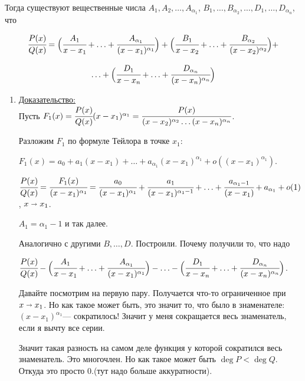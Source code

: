 \documentclass{article}
\newcommand{\prooff}[1]{{\underline{Доказательство:}} \\ }
\begin{document}
Тогда существуют вещественные числа $A_1, A_2,\ldots, A_{\alpha_1}$, $B_1,\ldots, B_{\alpha_2},\ldots, D_{1},\ldots, D_{\alpha_n}$, что

\[\cfrac{P(x)}{Q(x)}=\Big(\cfrac{A_1}{x-x_1}+ \ldots + \cfrac{A_{\alpha_1}}{(x-x_1)^{\alpha_1}}\Big) +\Big(\cfrac{B_1}{x-x_2}+ \ldots + \cfrac{B_{\alpha_2}}{(x-x_2)^{\alpha_2}}\Big) +\]

\[ \ldots + \Big(\cfrac{D_1}{x-x_n}+ \ldots + \cfrac{D_{\alpha_n}}{(x-x_n)^{\alpha_n}}\Big)\]

\begin{enumerate}
    \item[] \prooff{}
    Пусть $F_1(x) = \cfrac{P(x)}{Q(x)}(x-x_1)^{\alpha_1} = \cfrac{P(x)}{(x-x_2)^{\alpha_2}\ldots(x-x_n)^{\alpha_n}}$.

    Разложим $F_1$ по формуле Тейлора в точке $x_1$:

    $F_1(x) = a_0 + a_1(x-x_1) + \ldots + a_{\alpha_1}(x-x_1)^{\alpha_1}+o((x-x_1)^{\alpha_1})$.

    $\cfrac{P(x)}{Q(x)} = \cfrac{F_1(x)}{(x-x_1)^{\alpha_1}} = \cfrac{a_0}{(x-x_1)^{\alpha_1}} + \cfrac{a_1}{(x-x_1)^{\alpha_1-1}}+\ldots + \cfrac{a_{\alpha_1-1}}{(x-x_1)} + a_{\alpha_1}+o(1)$, $x\shortrightarrow x_1$.

    $A_1 = \alpha_1-1$  и так далее.

    Аналогично с другими $B,\ldots, D$. Построили. Почему получили то, что надо

    $\cfrac{P(x)}{Q(x)}-\Big(\cfrac{A_1}{x-x_1}+\ldots + \cfrac{A_{\alpha_1}}{(x-x_1)^{\alpha_1}}\Big)-\ldots -\Big(\cfrac{D_1}{x-x_n}+ \ldots + \cfrac{D_{\alpha_n}}{(x-x_n)^{\alpha_n}}\Big)$.

    Давайте посмотрим на первую пару. Получается что-то ограниченное при $x\shortrightarrow x_1$. Но как такое может быть, это значит то, что было в знаменателе: $(x-x_1)^{\alpha_1}$--- сократилось! Значит у меня сокращается весь знаменатель, если я вычту все серии.

    Значит такая разность на самом деле функция у которой сократился весь знаменатель. Это многочлен. Но как такое может быть $\deg P<\deg Q$. Откуда это просто 0.(тут надо больше аккуратности).
\end{enumerate}
\end{document}
